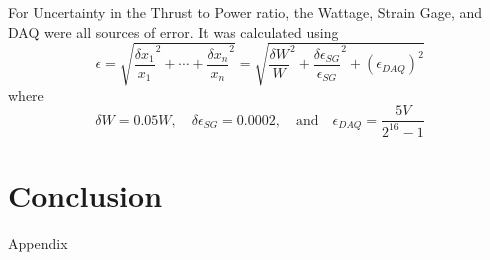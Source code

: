 \documentclass{article}
\begin{document}
  For Uncertainty in the Thrust to Power ratio, the Wattage, Strain Gage, and DAQ were all sources of error. It was calculated using \begin{equation}
    \epsilon = \sqrt{ \frac{\delta x_1}{x_1}^2 + \cdots + \frac{\delta x_n}{x_n}^2} = \sqrt{ \frac{\delta W}{W}^2 + \frac{\delta \epsilon_{SG}}{\epsilon_{SG}}^2 + (\epsilon_{DAQ})^2}
   \end{equation}
   where \begin{equation}
    \delta W = 0.05 W, \quad \delta \epsilon_{SG} = 0.0002, \quad \text{and} \quad \epsilon_{DAQ} = \frac{5V}{2^{16}-1} 
  \end{equation} 

\section{Conclusion}


\newpage
\thispagestyle{empty}  %
\begin{center}
	\vspace*{\fill}
	{\Huge Appendix}
	\vspace*{\fill}
\end{center}
\end{document}
